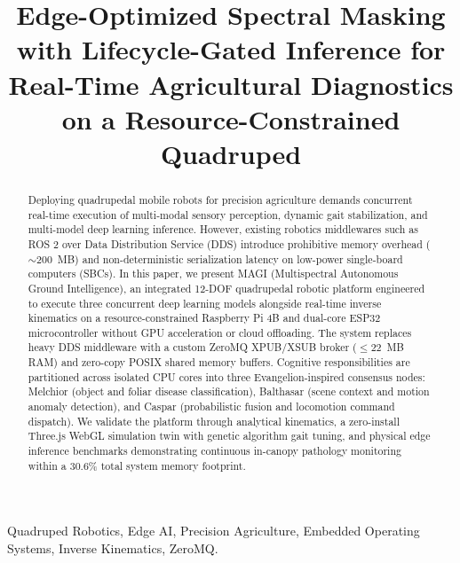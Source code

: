 \documentclass[conference]{IEEEtran}
\begin{document}
\title{Edge-Optimized Spectral Masking with Lifecycle-Gated Inference for Real-Time Agricultural Diagnostics on a Resource-Constrained Quadruped}

\author{
}

\maketitle

\begin{abstract}
Deploying quadrupedal mobile robots for precision agriculture demands concurrent real-time execution of multi-modal sensory perception, dynamic gait stabilization, and multi-model deep learning inference. However, existing robotics middlewares such as ROS 2 over Data Distribution Service (DDS) introduce prohibitive memory overhead ($\sim$200~MB) and non-deterministic serialization latency on low-power single-board computers (SBCs). In this paper, we present MAGI (Multispectral Autonomous Ground Intelligence), an integrated 12-DOF quadrupedal robotic platform engineered to execute three concurrent deep learning models alongside real-time inverse kinematics on a resource-constrained Raspberry Pi 4B and dual-core ESP32 microcontroller without GPU acceleration or cloud offloading. The system replaces heavy DDS middleware with a custom ZeroMQ XPUB/XSUB broker ($\le$22~MB RAM) and zero-copy POSIX shared memory buffers. Cognitive responsibilities are partitioned across isolated CPU cores into three Evangelion-inspired consensus nodes: Melchior (object and foliar disease classification), Balthasar (scene context and motion anomaly detection), and Caspar (probabilistic fusion and locomotion command dispatch). We validate the platform through analytical kinematics, a zero-install Three.js WebGL simulation twin with genetic algorithm gait tuning, and physical edge inference benchmarks demonstrating continuous in-canopy pathology monitoring within a 30.6\% total system memory footprint.
\end{abstract}

\begin{IEEEkeywords}
Quadruped Robotics, Edge AI, Precision Agriculture, Embedded Operating Systems, Inverse Kinematics, ZeroMQ.
\end{IEEEkeywords}
\end{document}
